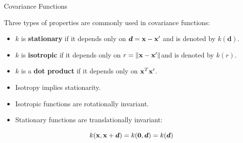 \begin{frame}[c]{Covariance Functions}

Three types of properties are commonly used in covariance functions:

\lz

\begin{itemize}
\item $k$ is \textbf{stationary} if it depends only on $\bm{d} =\mathbf{x} -\mathbf{x}^\prime$ and is denoted by $k(\bm{d})$.

\item $k$ is \textbf{isotropic} if it depends only on $r = \|\mathbf{x} - \mathbf{x}^\prime\|$and is denoted by $k(r)$.

\item $k$ is a \textbf{dot product} if it depends only on $\mathbf{x}^T \mathbf{x}^\prime$.
\end{itemize}

\lz
\lz

\begin{itemize}
\item[\faLightbulbO] Isotropy implies stationarity.
\item[\faLightbulbO] Isotropic functions are rotationally invariant.
\item[\faLightbulbO] Stationary functions are translationally invariant:
\vspace{-.3cm}

$$k(\mathbf{x},\mathbf{x} + \bm{d}) = k(\bm{0},\bm{d})=k(\bm{d})$$
\end{itemize}

\end{frame}

